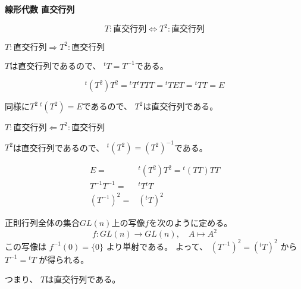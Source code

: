 \documentclass[12pt,b5paper]{ltjsarticle}
\begin{document}
\hrulefill

\textbf{線形代数 直交行列}

\begin{equation}
 T:\text{直交行列}
 \Leftrightarrow
 T^2:\text{直交行列}
\end{equation}

\dotfill

$T:\text{直交行列}\Rightarrow T^2:\text{直交行列}$

$T$は直交行列であるので、
${}^{t}T=T^{-1}$である。

\begin{equation}
 {}^{t}(T^2)T^2
  = {}^{t}T{}^{t}TTT
  = {}^{t}TET
  = {}^{t}TT
  = E
\end{equation}

同様に$T^2\ {}^{t}(T^2)=E$であるので、
$T^2$は直交行列である。

\dotfill

$T:\text{直交行列} \Leftarrow T^2:\text{直交行列}$

$T^2$は直交行列であるので、
${}^{t}(T^2)=(T^2)^{-1}$である。

\begin{align}
 E
 =& {}^{t}(T^2)T^2
 = {}^{t}(TT)TT\\
 T^{-1}T^{-1}=& {}^{t}T {}^{t}T\\
 (T^{-1})^{2}=& ({}^{t}T)^2
\end{align}

正則行列全体の集合$GL(n)$上の写像$f$を次のように定める。
\begin{equation}
 f: GL(n) \to GL(n),
  \quad
  A\mapsto A^2
\end{equation}
この写像は
$f^{-1}(0)=\{0\}$
より単射である。
よって、
$(T^{-1})^{2}= ({}^{t}T)^2$
から
$T^{-1}= {}^{t}T$
が得られる。

つまり、
$T$は直交行列である。


\hrulefill
\end{document}
